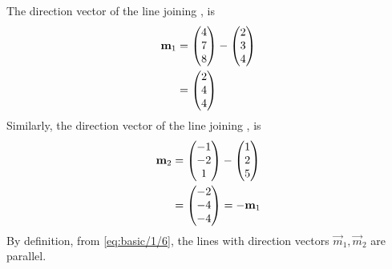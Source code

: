 The direction vector of the line joining ,  
is 
\begin{align}
	\mathbf{m}_1 &= \begin{pmatrix}4\\7\\8\end{pmatrix} -  \begin{pmatrix}2\\3\\4\end{pmatrix} 
	\\
		  &= \begin{pmatrix}2\\4\\4\end{pmatrix}
\end{align}
Similarly, 
the direction vector of the line joining ,  is 
\begin{align}
	\mathbf{m}_2 &= \begin{pmatrix}-1\\-2\\1\end{pmatrix}- \begin{pmatrix}1\\2\\5\end{pmatrix}
	\\
		  &= \begin{pmatrix}-2\\-4\\-4\end{pmatrix} = - \mathbf{m}_1
		  \label{eq:basic/1/6}
\end{align}
By definition, from
		  \eqref{eq:basic/1/6},
the lines with direction vectors $\vec{m}_1, \vec{m}_2$  are  parallel.  

